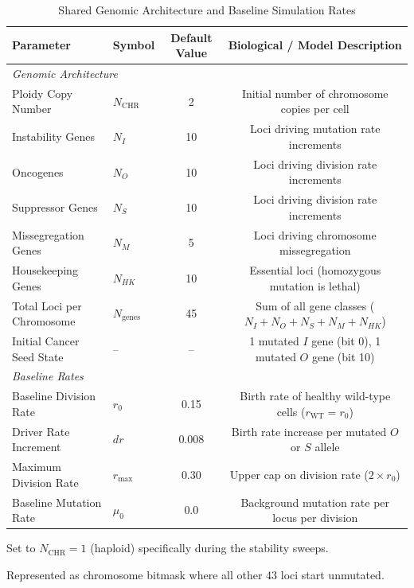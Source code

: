 \documentclass[11pt,a4paper]{article}
\begin{document}
\begin{table}[htbp]
\centering
\begin{threeparttable}
\caption{Shared Genomic Architecture and Baseline Simulation Rates}
\label{tab:baseline_params}
\begin{tabular}{llcc}
\toprule
\textbf{Parameter} & \textbf{Symbol} & \textbf{Default Value} & \textbf{Biological / Model Description} \\
\midrule
\multicolumn{4}{l}{\textit{Genomic Architecture}} \\
Ploidy Copy Number & $N_{\text{CHR}}$ & 2\tnote{a} & Initial number of chromosome copies per cell \\
Instability Genes & $N_I$ & 10 & Loci driving mutation rate increments \\
Oncogenes & $N_O$ & 10 & Loci driving division rate increments \\
Suppressor Genes & $N_S$ & 10 & Loci driving division rate increments \\
Missegregation Genes & $N_M$ & 5 & Loci driving chromosome missegregation \\
Housekeeping Genes & $N_{HK}$ & 10 & Essential loci (homozygous mutation is lethal) \\
Total Loci per Chromosome & $N_{\text{genes}}$ & 45 & Sum of all gene classes ($N_I + N_O + N_S + N_M + N_{HK}$) \\
Initial Cancer Seed State & -- & -- & 1 mutated $I$ gene (bit 0), 1 mutated $O$ gene (bit 10)\tnote{b} \\
\midrule
\multicolumn{4}{l}{\textit{Baseline Rates}} \\
Baseline Division Rate & $r_0$ & 0.15 & Birth rate of healthy wild-type cells ($r_{\text{WT}} = r_0$) \\
Driver Rate Increment & $dr$ & 0.008 & Birth rate increase per mutated $O$ or $S$ allele \\
Maximum Division Rate & $r_{\max}$ & 0.30 & Upper cap on division rate ($2 \times r_0$) \\
Baseline Mutation Rate & $\mu_0$ & 0.0 & Background mutation rate per locus per division \\
\bottomrule
\end{tabular}
\begin{tablenotes}
\small
\item[a] Set to $N_{\text{CHR}} = 1$ (haploid) specifically during the stability sweeps.
\item[b] Represented as chromosome bitmask where all other 43 loci start unmutated.
\end{tablenotes}
\end{threeparttable}
\end{table}
\end{document}
